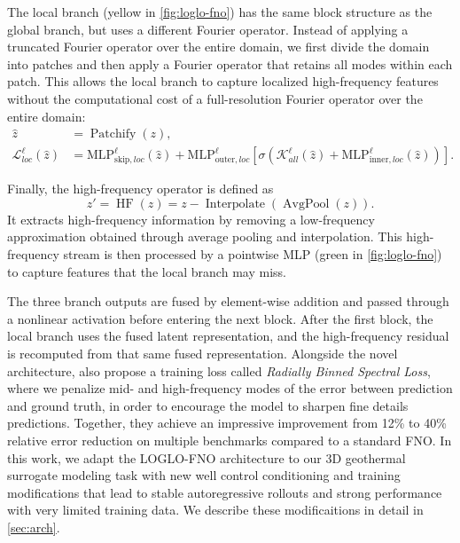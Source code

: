 \documentclass[pdflatex,sn-mathphys-ay]{sn-jnl}
\begin{document}
The local branch (yellow in \cref{fig:loglo-fno}) has the same block structure
as the global branch, but uses a different Fourier operator. Instead of applying
a truncated Fourier operator over the entire domain, we first divide the domain
into patches and then apply a Fourier operator that retains all modes within
each patch. This allows the local branch to capture localized high-frequency
features without the computational cost of a full-resolution Fourier operator
over the entire domain:
\begin{align}
  \hat{z} &= \operatorname{Patchify}(z),\\
  \mathcal{L}_{loc}^{\ell}(\hat{z})
  &= \mathrm{MLP}_{\mathrm{skip},loc}^{\ell}(\hat{z})
  + \mathrm{MLP}_{\mathrm{outer},loc}^{\ell}\!
    \left[
    \sigma\!\left(
      \mathcal{K}_{all}^{\ell}(\hat{z})
      + \mathrm{MLP}_{\mathrm{inner},loc}^{\ell}(\hat{z})
    \right)
    \right].
\end{align}

Finally, the high-frequency operator is defined as
\begin{equation}
z' = \operatorname{HF}(z)
= z-\operatorname{Interpolate}\!\left(\operatorname{AvgPool}(z)\right).
\end{equation}
It extracts high-frequency information by removing a low-frequency approximation
obtained through average pooling and interpolation. This high-frequency stream
is then processed by a pointwise MLP (green in \cref{fig:loglo-fno}) to capture
features that the local branch may miss.

The three branch outputs are fused by element-wise addition and passed through a
nonlinear activation before entering the next block. After the first block, the
local branch uses the fused latent representation, and the high-frequency
residual is recomputed from that same fused representation. Alongside the novel architecture,
\cite{loglofno} also propose a training loss called \emph{Radially Binned Spectral Loss}, where
we penalize mid- and high-frequency modes of the error between prediction and ground truth, 
in order to encourage
the model to sharpen fine details predictions. 
Together, they achieve an impressive improvement 
from 12\% to 40\% relative error reduction on multiple benchmarks 
compared to a standard FNO. In this work,
we adapt the LOGLO-FNO architecture to our 3D geothermal surrogate 
modeling task with new well control conditioning and 
training modifications that lead to stable autoregressive rollouts 
and strong performance with very limited training data. We describe these modificaitions
in detail in \cref{sec:arch}.
\end{document}
